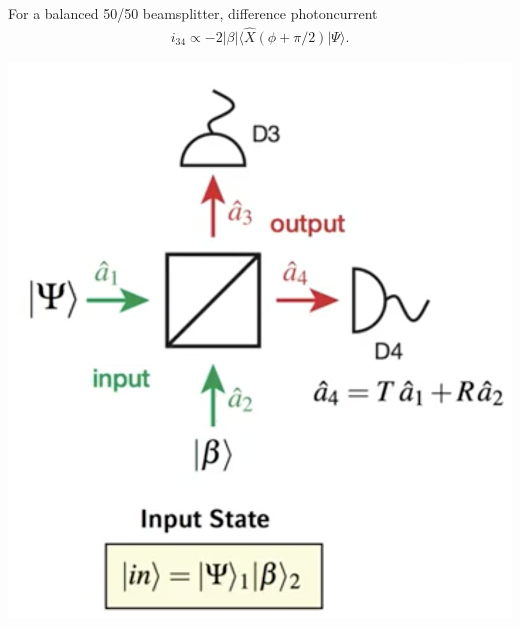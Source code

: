 \documentclass[../../note.tex]{subfiles}
\begin{document}
\begin{lemma}
    For a balanced 50/50 beamsplitter, difference photoncurrent
    \begin{align}
        i_{34} \propto -2 \vert \beta \vert \langle \hat{X} \left(\phi + \pi/2 \right) \vert \Psi \rangle.
    \end{align}
\end{lemma}
\includegraphics[scale=0.30]{../figures/difference photoncurrent.png}
\end{document}
